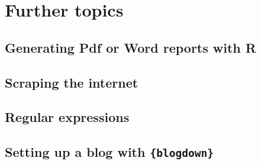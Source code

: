 \documentclass[]{gitbook}
\theoremstyle{definition}
\theoremstyle{definition}
\theoremstyle{definition}
\theoremstyle{remark}
\begin{document}
\hypertarget{further-topics}{%
\section{Further topics}\label{further-topics}}

\hypertarget{generating-pdf-or-word-reports-with-r}{%
\subsection{Generating Pdf or Word reports with
R}\label{generating-pdf-or-word-reports-with-r}}

\hypertarget{scraping-the-internet}{%
\subsection{Scraping the internet}\label{scraping-the-internet}}

\hypertarget{regular-expressions}{%
\subsection{Regular expressions}\label{regular-expressions}}

\hypertarget{setting-up-a-blog-with-blogdown}{%
\subsection{\texorpdfstring{Setting up a blog with
\texttt{\{blogdown\}}}{Setting up a blog with \{blogdown\}}}\label{setting-up-a-blog-with-blogdown}}


\end{document}

